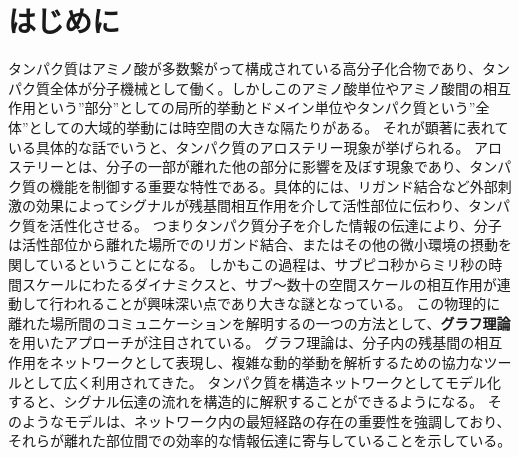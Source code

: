 \section{はじめに}

タンパク質はアミノ酸が多数繋がって構成されている高分子化合物であり、タンパク質全体が分子機械として働く。しかしこのアミノ酸単位やアミノ酸間の相互作用という”部分”としての局所的挙動とドメイン単位やタンパク質という”全体”としての大域的挙動には時空間の大きな隔たりがある。
それが顕著に表れている具体的な話でいうと、タンパク質のアロステリー現象が挙げられる。
アロステリーとは、分子の一部が離れた他の部分に影響を及ぼす現象であり、タンパク質の機能を制御する重要な特性である。具体的には、リガンド結合など外部刺激の効果によってシグナルが残基間相互作用を介して活性部位に伝わり、タンパク質を活性化させる。
つまりタンパク質分子を介した情報の伝達により、分子は活性部位から離れた場所でのリガンド結合、またはその他の微小環境の摂動を関しているということになる。
しかもこの過程は、サブピコ秒からミリ秒の時間スケールにわたるダイナミクスと、サブ\text{\AA}～数十\text{\AA}の空間スケールの相互作用が連動して行われることが興味深い点であり大きな謎となっている。
この物理的に離れた場所間のコミュニケーションを解明するの一つの方法として、\textbf{グラフ理論}を用いたアプローチが注目されている。
グラフ理論は、分子内の残基間の相互作用をネットワークとして表現し、複雑な動的挙動を解析するための協力なツールとして広く利用されてきた。
タンパク質を構造ネットワークとしてモデル化すると、シグナル伝達の流れを構造的に解釈することができるようになる。
そのようなモデルは、ネットワーク内の最短経路の存在の重要性を強調しており、それらが離れた部位間での効率的な情報伝達に寄与していることを示している。
